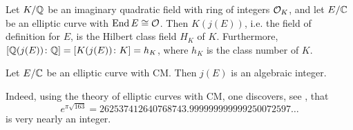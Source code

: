 \begin{thm}
Let $K/\mathbb{Q}$ be an imaginary quadratic field with ring of integers $\mathcal{O}_K$, and let $E/\mathbb{C}$ be an elliptic curve with $\operatorname{End} E \cong \mathcal{O}$. Then $K(j(E))$, i.e. the field of definition for $E$, is the Hilbert class field $H_K$ of $K$. Furthermore, $[\mathbb{Q}(j(E)) \colon \mathbb{Q}]= [K(j(E)) \colon K]= h_K$, where $h_K$ is the class number of $K$. 
\end{thm}


\begin{thm}
Let $E/\mathbb{C}$ be an elliptic curve with CM. Then $j(E)$ is an algebraic integer. 
\end{thm}


Indeed, using the theory of elliptic curves with CM, one discovers, see \cite{silvermanadvanced}, that 
	\[
	e^{\pi\sqrt{163}}= 262537412640768743.999999999999250072597\ldots
	\]
is very nearly an integer. 